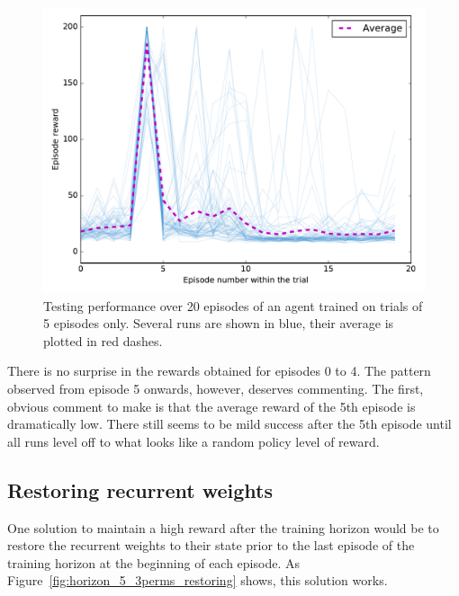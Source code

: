 \begin{figure}
	\centering
	\includegraphics[width=0.8\linewidth]{fig/horizon_5_3perms.pdf}
	\caption{Testing performance over 20 episodes of an agent trained on 
	trials of 5 episodes only. Several runs are shown in blue, their
	average is plotted in red dashes.}
	\label{fig:horizon_5_3perms}
\end{figure}

There is no surprise in the rewards obtained for episodes 0 to 4. The pattern
observed from episode 5 onwards, however, deserves commenting. The first, 
obvious comment to make is that the average reward of the 5th episode is
dramatically low.  There still seems to be mild success after the 5th episode 
until all runs level off to what looks like a random policy level of 
reward.

\subsection{Restoring recurrent weights}
One solution to maintain a high reward after the training horizon would be 
to restore the recurrent weights to their state prior to the last episode of 
the training horizon at the beginning of each episode. As 
Figure~\ref{fig:horizon_5_3perms_restoring} shows, this solution works.\\


